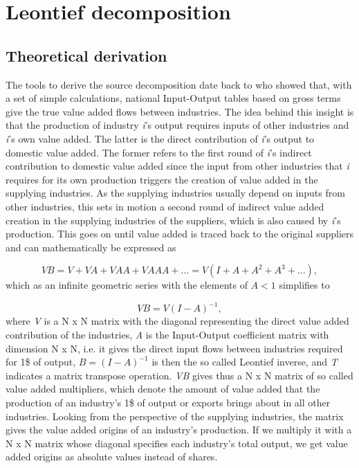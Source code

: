 \documentclass{article}\usepackage[]{graphicx}\usepackage[]{color}
\begin{document}
\section{Leontief decomposition}

\subsection{Theoretical derivation}

The tools to derive the source decomposition date back to \citet{wale36} who showed that, with a set of simple calculations, national Input-Output tables based on gross terms give the true value added flows between industries. The idea behind this insight is that the production of industry \textit{i}'s output requires inputs of other industries and \textit{i}'s own value added. The latter is the direct contribution of \textit{i}'s output to domestic value added. The former refers to the first round of \textit{i}'s indirect contribution to domestic value added since the input from other industries that \textit{i} requires for its own production triggers the creation of value added in the supplying industries. As the supplying industries usually depend on inputs from other industries, this sets in motion a second round of indirect value added creation in the supplying industries of the suppliers, which is also caused by \textit{i}'s production. This goes on until value added is traced back to the original suppliers and can mathematically be expressed as 

\begin{equation}
VB = V + VA + VAA + VAAA + ... = V (I+A+A^{2}+A^{3}+...),
\end{equation}
which as an infinite geometric series with the elements of $A<1$ simplifies to

\begin{equation}
VB = V (I-A)^{-1},
\end{equation}
where \textit{V} is a N x N matrix with the diagonal representing the direct value added contribution of the industries, \textit{A} is the Input-Output coefficient matrix with dimension N x N, i.e. it gives the direct input flows between industries required for 1\$ of output, $B = (I-A)^{-1}$ is then the so called Leontief inverse, and \textit{T} indicates a matrix transpose operation. \textit{VB} gives thus a N x N matrix of so called value added multipliers, which denote the amount of value added that the production of an industry's 1\$ of output or exports brings about in all other industries. Looking from the perspective of the supplying industries, the matrix gives the value added origins of an industry's production. If we multiply it with a N x N matrix whose diagonal specifies each industry's total output, we get value added origins as absolute values instead of shares.
\end{document}
